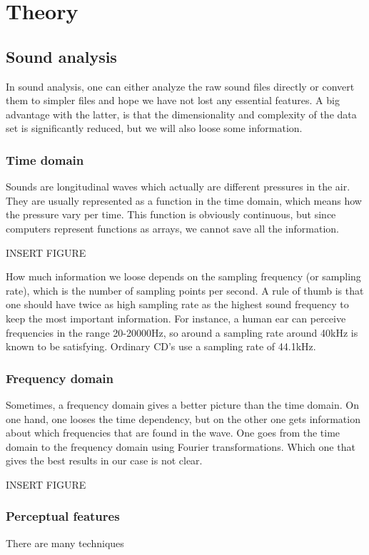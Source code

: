 \section{Theory} \label{sec:theory}

\subsection{Sound analysis}
In sound analysis, one can either analyze the raw sound files directly or convert them to simpler files and hope we have not lost any essential features. A big advantage with the latter, is that the dimensionality and complexity of the data set is significantly reduced, but we will also loose some information. 

\subsubsection{Time domain}
Sounds are longitudinal waves which actually are different pressures in the air. They are usually represented as a function in the time domain, which means how the pressure vary per time. This function is obviously continuous, but since computers represent functions as arrays, we cannot save all the information. 

INSERT FIGURE

How much information we loose depends on the sampling frequency (or sampling rate), which is the number of sampling points per second. A rule of thumb is that one should have twice as high sampling rate as the highest sound frequency to keep the most important information. For instance, a human ear can perceive frequencies in the range 20-20000Hz, so around a sampling rate around 40kHz is known to be satisfying. Ordinary CD's use a sampling rate of 44.1kHz. 

\subsubsection{Frequency domain}
Sometimes, a frequency domain gives a better picture than the time domain. On one hand, one looses the time dependency, but on the other one gets information about which frequencies that are found in the wave. One goes from the time domain to the frequency domain using Fourier transformations. Which one that gives the best results in our case is not clear. 

INSERT FIGURE

\subsubsection{Perceptual features}
There are many techniques 

